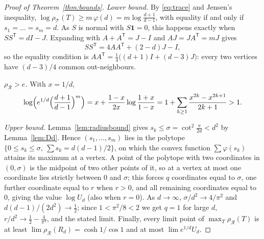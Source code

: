 \documentclass[11pt,a4paper,reqno]{amsart}
\theoremstyle{remark}
\numberwithin{equation}{section}
\newcommand{\one}{\mathbf{1}}
\newcommand{\T}{\mathsf{T}}
\newcommand{\cT}{\mathcal{T}}
\newcommand{\cR}{\mathcal{R}}
\begin{document}
\begin{proof}[Proof of Theorem~\ref{thm:bounds}]
\emph{Lower bound.} By \eqref{eq:trace} and Jensen's inequality, $\log\rho_\cT(T)\ge m\,\varphi(d)=m\log\frac{d+1}{d-1}$, with equality if and only if $s_1=\dots=s_m=d$. As $S$ is normal with $S\one=0$, this happens exactly when $SS^\T=dI-J$. Expanding with $A+A^\T=J-I$ and $AJ=JA^\T=mJ$ gives
\[
SS^\T=4AA^\T+(2-d)J-I,
\]
so the equality condition is $AA^\T=\frac14\bigl((d+1)I+(d-3)J\bigl)$: every two vertices have $(d-3)/4$ common out-neighbours.

\emph{$\rho_\cR>e$.} With $x=1/d$,
\[
\log\Bigl(e^{1/d}\Bigl(\frac{d+1}{d-1}\Bigr)^m\Bigr)=x+\frac{1-x}{2x}\log\frac{1+x}{1-x}=1+\sum_{k\ge1}\frac{x^{2k}-x^{2k+1}}{2k+1}>1.
\]

\emph{Upper bound.} Lemma~\ref{lem:radiusbound} gives $s_k\le\sigma=\cot^2\frac\pi{2d}<d^2$ by Lemma~\ref{lem:Dd}. Hence $(s_1,\dots,s_m)$ lies in the polytope $\{0\le s_k\le\sigma,\ \sum s_k=d(d-1)/2\}$, on which the convex function $\sum\varphi(s_k)$ attains its maximum at a vertex. A point of the polytope with two coordinates in $(0,\sigma)$ is the midpoint of two other points of it, so at a vertex at most one coordinate lies strictly between $0$ and $\sigma$; this forces $q$ coordinates equal to $\sigma$, one further coordinate equal to $r$ when $r>0$, and all remaining coordinates equal to $0$, giving the value $\log U_d$ (also when $r=0$). As $d\to\infty$, $\sigma/d^2\to4/\pi^2$ and $d(d-1)/(2d^2)\to\frac12$; since $1<\pi^2/8<2$ we get $q=1$ for large $d$, $r/d^2\to\frac12-\frac4{\pi^2}$, and the stated limit. Finally, every limit point of $\max_T\rho_\cR(T)$ is at least $\lim\rho_\cR(R_d)=\cosh1/\cos1$ and at most $\lim e^{1/d}U_d$.
\end{proof}
\end{document}
